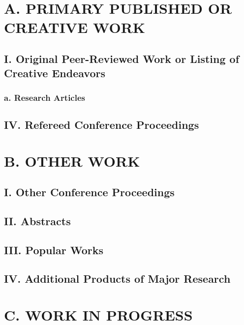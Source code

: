\documentclass[11pt]{res}
\newcommand{\MarginText}[1]{\section{#1}\vspace{10pt}}
\begin{document}


\address{}
\address{}

\newcommand{\DOI}[1]{\href{https://doi.org/#1}{doi:#1}}
\begin{resume}

\setcounter{page}{5}
\MarginText{A. PRIMARY PUBLISHED OR CREATIVE WORK}
\subsection{I. Original Peer-Reviewed Work or Listing of Creative Endeavors}
\subsubsection{a. Research Articles}
\nocite{*}
\vspace{10pt}
\printbibliography[heading=none]

\subsection{IV. Refereed Conference Proceedings}
\nocite{*}
\vspace{10pt}
\printbibliography[heading=none]

\MarginText{B. OTHER WORK}
\subsection{I. Other Conference Proceedings}
\nocite{*}
\vspace{10pt}
\printbibliography[heading=none]

\subsection{II. Abstracts}
\subsection{III. Popular Works}
\subsection{IV. Additional Products of Major Research}
\nocite{*}
\vspace{10pt}
\printbibliography[heading=none]

\MarginText{C. WORK IN PROGRESS}
\vspace{10pt}
\nocite{*}
\vspace{10pt}
\printbibliography[heading=none]
\clearpage

\end{resume}
\end{document}
